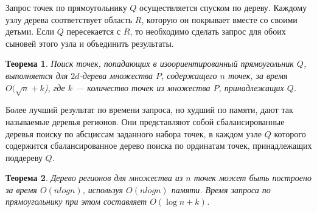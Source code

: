 \documentclass[a4paper]{article}
\newtheorem{theorem}{Теорема}
\begin{document}
Запрос точек по прямоугольнику $Q$ осуществляется спуском по дереву.
Каждому узлу дерева соответствует область $R$, которую он покрывает вместе
со своими детьми. Если $Q$ пересекается с $R$, то необходимо сделать
запрос для обоих сыновей этого узла и объединить результаты.

\begin{theorem}
  Поиск точек, попадающих в изоориентированный прямоугольник $Q$,
  выполняется для $2d$-дерева множества $P$, содержащего $n$ точек, за время
  $O(\sqrt n + k$), где $k$ --- количество точек из множества $P$,
  принадлежащих $Q$.
\end{theorem}

Более лучший результат по времени запроса, но худший по памяти, дают
так называемые деревья регионов. Они представляют собой
сбалансированные деревья поиску по абсциссам заданного набора точек, в
каждом узле $Q$ которого содержится сбалансированное дерево поиска по
ординатам точек, принадлежащих поддереву $Q$.

\begin{theorem}
  Дерево регионов для множества из $n$ точек может быть построено за
  время $O(n log n)$, используя $O(n log n)$ памяти. Время запроса по
  прямоугольнику при этом составляет $O(\log n + k)$.
\end{theorem}
\end{document}
